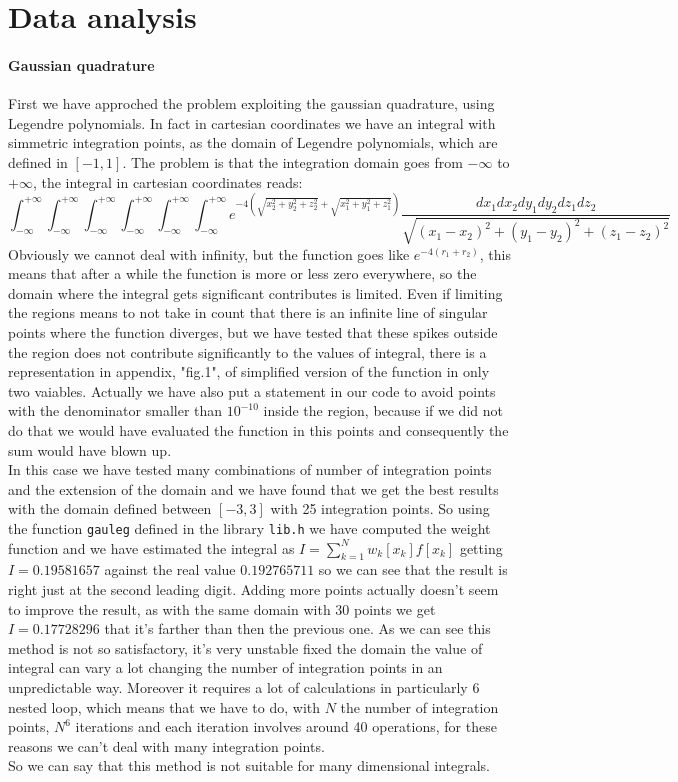 \documentclass[10pt,a4paper,titlepage]{article}
\begin{document}
\section{Data analysis}
\paragraph{Gaussian quadrature}First we have approched the problem exploiting the gaussian quadrature, using Legendre polynomials. In fact in cartesian coordinates we have an integral with simmetric integration points, as the domain of Legendre polynomials, which are defined in $[-1,1]$. The problem is that the integration domain goes from $-\infty$ to $+\infty$, the integral in cartesian coordinates reads:\begin{equation} \int_{-\infty}^{+\infty}\int_{-\infty}^{+\infty}\int_{-\infty}^{+\infty}\int_{-\infty}^{+\infty}\int_{-\infty}^{+\infty}\int_{-\infty}^{+\infty}e^{-4( \sqrt{x_2^2+y_2^2+z_2^2}+\sqrt{x_1^2+y_1^2+z_1^2})}\frac{dx_1dx_2dy_1dy_2dz_1dz_2}{\sqrt{(x_1-x_2)^2+(y_1-y_2)^2+(z_1-z_2)^2}}
\end{equation}
Obviously we cannot deal with infinity, but the function goes like $e^{-4(r_1+r_2)}$, this means that after a while the function is more or less zero everywhere, so the domain where the integral gets significant contributes is limited. Even if limiting the regions means to not take in count that there is an infinite line of singular points where the function diverges, but we have tested that these spikes outside the region does not contribute significantly to the values of integral, there is a representation in appendix, "fig.1", of simplified  version of the function in only two vaiables. 
Actually we have also put a statement in our code to avoid points with the denominator smaller than $10^{-10}$ inside the region, because if we did not do that we would have evaluated the function in this points and consequently the sum would have blown up.
\\
In this case we have tested many combinations of number of integration points and the extension of the domain and we have found that we get the best results with the domain defined between $[-3,3]$ with 25 integration points. So using the function \texttt{gauleg} defined in the library \texttt{lib.h} we have computed the weight function and we have estimated the integral as $I=  \sum_{k=1}^N w_k[x_k] f[x_k]$ 
getting $I=0.19581657$ against the real value   $0.192765711$ so we can see that the result is right just at the second leading digit. Adding more points actually doesn't seem to improve the result, as with the same domain with $30$ points we get $I=0.17728296$ that it's farther than then the previous one. As we can see this method is not so satisfactory, it's very unstable fixed the domain the value of integral can vary a lot changing the number of integration points in an unpredictable way. Moreover it requires a lot of calculations in particularly 6 nested loop, which means that we have to do, with $N$ the number of integration points, $N^6$ iterations and each iteration involves around 40 operations, for these reasons we can't deal with many integration points. 
\\
So we can say that this method is not suitable for many dimensional integrals.
\end{document}
